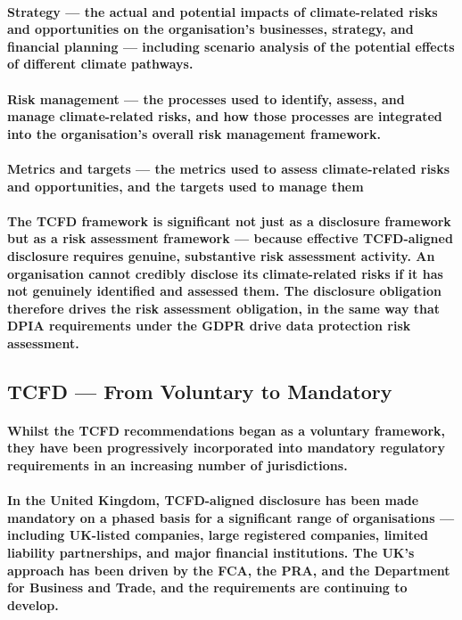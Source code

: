 \paragraph{\textbf{Strategy} — the actual and potential impacts of climate-related risks and opportunities on the organisation's businesses, strategy, and financial planning — including scenario analysis of the potential effects of different climate pathways.}
\paragraph{\textbf{Risk management} — the processes used to identify, assess, and manage climate-related risks, and how those processes are integrated into the organisation's overall risk management framework.}
\paragraph{\textbf{Metrics and targets} — the metrics used to assess climate-related risks and opportunities, and the targets used to manage them}
\paragraph{The TCFD framework is significant not just as a disclosure framework but as a risk assessment framework — because effective TCFD-aligned disclosure requires genuine, substantive risk assessment activity. An organisation cannot credibly disclose its climate-related risks if it has not genuinely identified and assessed them. The disclosure obligation therefore drives the risk assessment obligation, in the same way that DPIA requirements under the GDPR drive data protection risk assessment.}

\subsection{TCFD — From Voluntary to Mandatory}
\paragraph{Whilst the TCFD recommendations began as a voluntary framework, they have been progressively incorporated into mandatory regulatory requirements in an increasing number of jurisdictions.}
\paragraph{In the \textbf{United Kingdom}, TCFD-aligned disclosure has been made mandatory on a phased basis for a significant range of organisations — including UK-listed companies, large registered companies, limited liability partnerships, and major financial institutions. The UK's approach has been driven by the FCA, the PRA, and the Department for Business and Trade, and the requirements are continuing to develop.}
